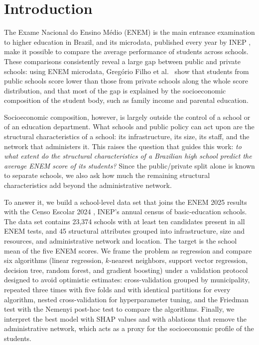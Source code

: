 \section{Introduction}
\label{sec:introduction}

The Exame Nacional do Ensino M\'edio (ENEM) is the main entrance examination to higher education
in Brazil, and its microdata, published every year by INEP \cite{inep2025enem}, make it possible
to compare the average performance of students across schools. These comparisons consistently
reveal a large gap between public and private schools: using ENEM microdata, Greg\'orio Filho
et al.~\cite{gregorio2026hiato} show that students from public schools score lower than those from
private schools along the whole score distribution, and that most of the gap is explained by
the socioeconomic composition of the student body, such as family income and parental education.

Socioeconomic composition, however, is largely outside the control of a school or of an
education department. What schools and public policy can act upon are the structural
characteristics of a school: its infrastructure, its size, its staff, and the network that
administers it. This raises the question that guides this work: \emph{to what extent do the
structural characteristics of a Brazilian high school predict the average ENEM score of its
students?} Since the public/private split alone is known to separate schools, we also ask how
much the remaining structural characteristics add beyond the administrative network.

To answer it, we build a school-level data set that joins the ENEM 2025 results with the
Censo Escolar 2024 \cite{inep2024censo}, INEP's annual census of basic-education schools. The
data set contains 23{,}374 schools with at least ten candidates present in all ENEM tests, and
45 structural attributes grouped into infrastructure, size and resources, and administrative
network and location. The target is the school mean of the five ENEM scores. We frame the
problem as regression and compare six algorithms (linear regression, $k$-nearest neighbors,
support vector regression, decision tree, random forest, and gradient boosting) under a
validation protocol designed to avoid optimistic estimates: cross-validation grouped by
municipality, repeated three times with five folds and with identical partitions for every
algorithm, nested cross-validation for hyperparameter tuning, and the Friedman test with the
Nemenyi post-hoc test to compare the algorithms. Finally, we interpret the best model with
SHAP values and with ablations that remove the administrative network, which acts as a proxy
for the socioeconomic profile of the students.

